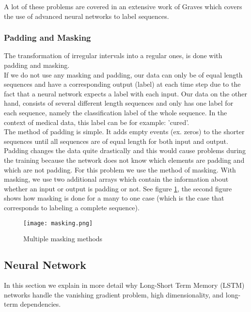 A lot of these problems are covered in an extensive work of Graves \cite{gravesLstm:thesis} which covers the use of advanced neural networks to label sequences.

\subsubsection{Padding and Masking}
The transformation of irregular intervals into a regular ones, is done with padding and masking. \\

If we do not use any masking and padding, our data can only be of equal length sequences and have a corresponding output (label) at each time step due to the fact that a neural network expects a label with each input. Our data on the other hand, consists of several different length sequences and only has one label for each sequence, namely the classification label of the whole sequence. In the context of medical data, this label can be for example: 'cured'. \\

The method of padding is simple. It adds empty events (ex. zeros) to the shorter sequences until all sequences are of equal length for both input and output. \\
Padding changes the data quite drastically and this would cause problems during the training because the network does not know which elements are padding and which are not padding. For this problem we use the method of masking. With masking, we use two additional arrays which contain the information about whether an input or output is padding or not. See figure \ref{fig:masking}, the second figure shows how masking is done for a many to one case (which is the case that corresponds to labeling a complete sequence). \\

\begin{figure}[!htb]
	\centering
	\texttt{[image: masking.png]}
	\caption{Multiple masking methods \cite{dl4jRnn:online}}
	\label{fig:masking}
\end{figure} 


\subsection{Neural Network}
\label{sec:nn}

In this section we explain in more detail why Long-Short Term Memory (LSTM) \cite{lstmOrginin:article} networks handle the vanishing gradient problem, high dimensionality, and long-term dependencies. \\

